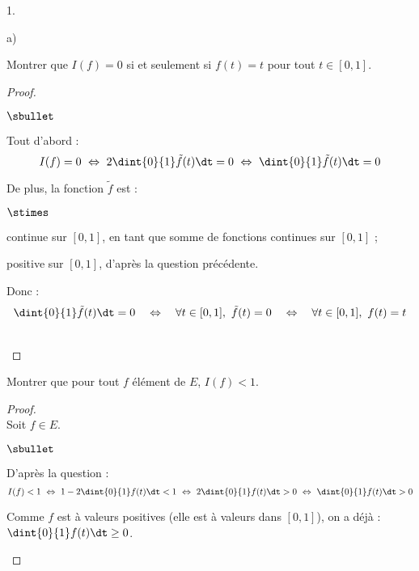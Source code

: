 \documentclass[11pt]{article}%
\begin{document}
\begin{noliste}{1.}
\begin{noliste}{a)}
  
  \item Montrer que $I(f) =0$ si et seulement si $f(t)=t$ pour tout $t 
  \in [0,1]$. 
  
  \begin{proof}~
  \begin{noliste}{$\sbullet$}
    \item Tout d'abord :
    \[
      I(f) = 0 \ \Leftrightarrow \ 2 \dint{0}{1} \tilde{f}(t) \dt =0
      \ \Leftrightarrow \ \dint{0}{1} \tilde{f}(t) \dt=0
    \]

    \item De plus, la fonction $\tilde{f}$ est :
    \begin{noliste}{$\stimes$}
      \item continue sur $[0,1]$, en tant que somme de fonctions
      continues sur $[0,1]$ ;
      \item positive sur $[0,1]$, d'après la question précédente.
    \end{noliste}
    Donc :
    \[
      \dint{0}{1} \tilde{f}(t) \dt = 0 \quad \Leftrightarrow \quad 
      \forall t \in [0,1], \ \tilde{f}(t)=0 \quad 
      \Leftrightarrow \quad \forall t \in [0,1], \ f(t)=t
    \]
  \end{noliste}
  ~\\[-1cm]
  \end{proof}
  
  
  
  \newpage
  

  
  \item Montrer que pour tout $f$ élément de $E$, $I(f) < 1$.
  
  \begin{proof}~\\
    Soit $f\in E$.
    \begin{noliste}{$\sbullet$}
      \item D'après la question  :
      \[
        I(f) <1 \ \Leftrightarrow \ 1-2\dint{0}{1} f(t) \dt <1 \
        \Leftrightarrow \ 2 \dint{0}{1} f(t) \dt >0 \ 
        \Leftrightarrow \ \dint{0}{1} f(t) \dt >0
      \]
      
      \item Comme $f$ est à valeurs positives (elle est à valeurs dans 
      $[0,1]$), on a déjà : $\dint{0}{1} f(t) \dt \geq 0$.
      

\end{noliste}
\end{proof}
\end{noliste}
\end{noliste}
\end{document}
